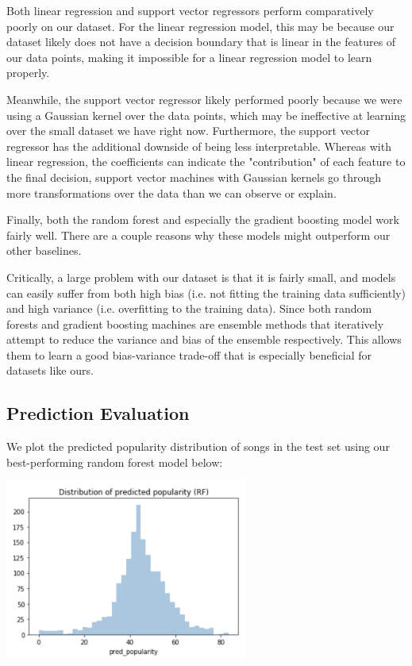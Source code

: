 \documentclass[journal]{IEEEtran}
\begin{document}
Both linear regression and support vector regressors perform comparatively poorly on our dataset. For the linear regression model, this may be because our dataset likely does not have a decision boundary that is linear in the features of our data points, making it impossible for a linear regression model to learn properly. 

Meanwhile, the support vector regressor likely performed poorly because we were using a Gaussian kernel over the data points, which may be ineffective at learning over the small dataset we have right now. Furthermore, the support vector regressor has the additional downside of being less interpretable. Whereas with linear regression, the coefficients can indicate the "contribution" of each feature to the final decision, support vector machines with Gaussian kernels go through more transformations over the data than we can observe or explain.

Finally, both the random forest and especially the gradient boosting model work fairly well. There are a couple reasons why these models might outperform our other baselines. 

Critically, a large problem with our dataset is that it is fairly small, and models can easily suffer from both high bias (i.e. not fitting the training data sufficiently) and high variance (i.e. overfitting to the training data). Since both random forests and gradient boosting machines are ensemble methods that iteratively attempt to reduce the variance and bias of the ensemble respectively. This allows them to learn a good bias-variance trade-off that is especially beneficial for datasets like ours.

\subsection{Prediction Evaluation}

We plot the predicted popularity distribution of songs in the test set using our best-performing random forest model below:

\includegraphics[width=8cm]{images/pred_popularity_distribution.png}
\end{document}

